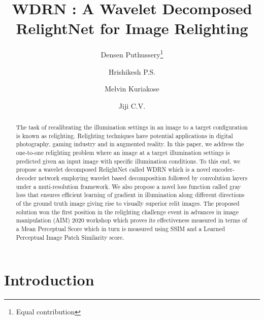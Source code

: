 \documentclass[runningheads]{llncs}
\begin{document}
\pagestyle{headings}
\mainmatter
\def\ECCVSubNumber{90}  

\title{WDRN : A Wavelet Decomposed RelightNet for Image Relighting} 

\author{Densen Puthussery\thanks{Equal contribution} \and Hrishikesh P.S. \and Melvin Kuriakose \and Jiji C.V.}
\maketitle

\begin{abstract}
The task of recalibrating the illumination settings in an image to a target configuration is known as relighting. Relighting techniques have potential applications in digital photography, gaming industry and in augmented reality. In this paper, we address the one-to-one relighting problem where an image at a target illumination settings is predicted given an input image with specific illumination conditions. To this end, we propose a wavelet decomposed RelightNet called WDRN which is a novel encoder-decoder network employing wavelet based decomposition followed by convolution layers under a muti-resolution framework. We also propose a novel loss function called gray loss that ensures efficient learning of gradient in illumination along different directions of the ground truth image giving rise to visually superior relit images. The proposed solution won the first position in the relighting challenge event in advances in image manipulation (AIM) 2020 workshop which proves its effectiveness measured in terms of a Mean Perceptual Score which in turn is measured using SSIM and a Learned Perceptual Image Patch Similarity score.

\end{abstract}

\section{Introduction}
\end{document}
